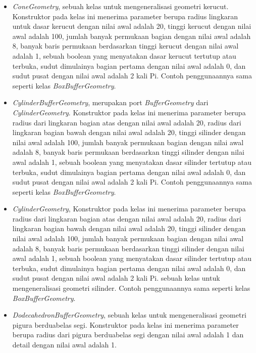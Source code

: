 \documentclass[a4paper,twoside]{article}
\begin{document}
\begin{enumerate}
\begin{itemize}
\begin{itemize}
	\item {\it ConeGeometry}, sebuah kelas untuk mengeneralisasi geometri kerucut. Konstruktor pada kelas ini menerima parameter berupa radius lingkaran untuk dasar kerucut dengan nilai awal adalah 20, tinggi kerucut dengan nilai awal adalah 100, jumlah banyak permukaan bagian dengan nilai awal adalah 8, banyak baris permukaan berdasarkan tinggi kerucut dengan nilai awal adalah 1, sebuah boolean yang menyatakan dasar kerucut tertutup atau terbuka, sudut dimulainya bagian pertama dengan nilai awal adalah 0, dan sudut pusat dengan nilai awal adalah 2 kali Pi. Contoh penggunaannya sama seperti kelas {\it BoxBufferGeometry}.
	
	\item {\it CylinderBufferGeometry}, merupakan port {\it BufferGeometry} dari {\it CylinderGeometry}. Konstruktor pada kelas ini menerima parameter berupa radius dari lingkaran bagian atas dengan nilai awal adalah 20, radius dari lingkaran bagian bawah dengan nilai awal adalah 20, tinggi silinder dengan nilai awal adalah 100, jumlah banyak permukaan bagian dengan nilai awal adalah 8, banyak baris permukaan berdasarkan tinggi silinder dengan nilai awal adalah 1, sebuah boolean yang menyatakan dasar silinder tertutup atau terbuka, sudut dimulainya bagian pertama dengan nilai awal adalah 0, dan sudut pusat dengan nilai awal adalah 2 kali Pi. Contoh penggunaannya sama seperti kelas {\it BoxBufferGeometry}.
	
	\item {\it CylinderGeometry}, Konstruktor pada kelas ini menerima parameter berupa radius dari lingkaran bagian atas dengan nilai awal adalah 20, radius dari lingkaran bagian bawah dengan nilai awal adalah 20, tinggi silinder dengan nilai awal adalah 100, jumlah banyak permukaan bagian dengan nilai awal adalah 8, banyak baris permukaan berdasarkan tinggi silinder dengan nilai awal adalah 1, sebuah boolean yang menyatakan dasar silinder tertutup atau terbuka, sudut dimulainya bagian pertama dengan nilai awal adalah 0, dan sudut pusat dengan nilai awal adalah 2 kali Pi. sebuah kelas untuk mengeneralisasi geometri silinder. Contoh penggunaannya sama seperti kelas {\it BoxBufferGeometry}.

	\item {\it DodecahedronBufferGeometry}, sebuah kelas untuk mengeneralisasi geometri pigura berduabelas segi. Konstruktor pada kelas ini menerima parameter berupa radius dari pigura berduabelas segi dengan nilai awal adalah 1 dan detail dengan nilai awal adalah 1.


\end{itemize}
\end{itemize}
\end{enumerate}
\end{document}
